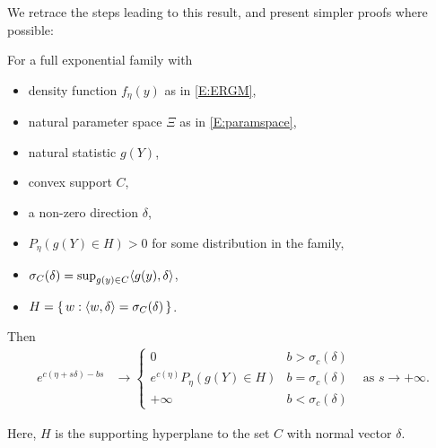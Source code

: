 We retrace the steps leading to this result, and present simpler proofs where possible:
\begin{theorem}\label{Thm:e_c}
For a full exponential family with
\begin{itemize}
\item density function $f_\eta(y)$ as in \eqref{E:ERGM},
\item natural parameter space $\Xi$ as in \eqref{E:paramspace},
\item natural statistic $g(Y)$,
\item convex support $C$,
\item  a non-zero direction $\delta$,
\item $P_\eta(g(Y) \in H ) > 0$ for some distribution in the family,
\item $\sigma_C (\delta) = \sup_{g(y) \in C} \langle  g(y), \delta \rangle$,
\item $H = \{\, w: \langle w, \delta \rangle = \sigma_C(\delta)  \,\}$.
\end{itemize}
Then
\begin{align*}
e^{c(\eta + s \delta) - bs} &\to 
		\begin{cases} 
			0 									& b > \sigma_c(\delta) \\
			e^{c(\eta)} P_\eta(g(Y) \in H ) 		& b = \sigma_c(\delta) \\
			+\infty								& b < \sigma_c(\delta)
		\end{cases}
& \text{as } s \to +\infty.
\end{align*}

\end{theorem}
Here, $H$ is the supporting hyperplane to the set $C$ with normal vector $\delta$.

